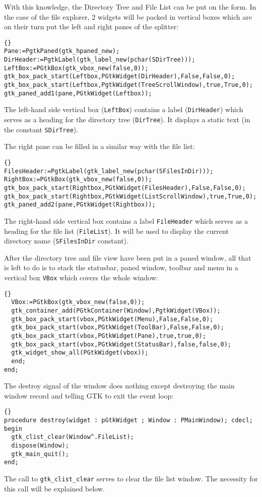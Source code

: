 \documentclass[10pt]{article}
\begin{document}
With this knowledge, the Directory Tree and File List can be put on the
form. In the case of the file explorer, 2 widgets will be packed in vertical
boxes which are on their turn put the left and right panes of the splitter: 
\begin{lstlisting}{}
Pane:=PgtkPaned(gtk_hpaned_new);
DirHeader:=PgtkLabel(gtk_label_new(pchar(SDirTree)));
LeftBox:=PGtkBox(gtk_vbox_new(false,0));
gtk_box_pack_start(Leftbox,PGtkWidget(DirHeader),False,False,0);
gtk_box_pack_start(Leftbox,PgtkWidget(TreeScrollWindow),true,True,0);
gtk_paned_add1(pane,PGtkWidget(Leftbox));
\end{lstlisting}
The left-hand side vertical box (\lstinline|LeftBox|) contains a label 
(\lstinline|DirHeader|) which serves as a  heading for the directory tree (\lstinline|DirTree|). 
It displays a static text (in the constant \lstinline|SDirTree|).

The right pane can be filled in a similar way with the file list:
\begin{lstlisting}{}
FilesHeader:=PgtkLabel(gtk_label_new(pchar(SFilesInDir)));
RightBox:=PGtkBox(gtk_vbox_new(false,0));
gtk_box_pack_start(Rightbox,PGtkWidget(FilesHeader),False,False,0);
gtk_box_pack_start(Rightbox,PGtkWidget(ListScrollWindow),true,True,0);
gtk_paned_add2(pane,PGtkWidget(Rightbox));
\end{lstlisting}
The right-hand side vertical box contains a label \lstinline|FileHeader| 
which serves as a heading for the file list (\lstinline|FileList|). 
It will be used to display the current directory name 
(\lstinline|SFilesInDir| constant).

After the directory tree and file view have been put in a paned window,
all that is left to do is to stack the statusbar, paned window, toolbar 
and menu in a vertical box \lstinline|VBox| which covers the whole window:
\begin{lstlisting}{}
  VBox:=PGtkBox(gtk_vbox_new(false,0));
  gtk_container_add(PGtkContainer(Window),PgtkWidget(VBox));
  gtk_box_pack_start(vbox,PGtkWidget(Menu),False,False,0);
  gtk_box_pack_start(vbox,PGtkWidget(ToolBar),False,False,0);
  gtk_box_pack_start(vbox,PGtkWidget(Pane),true,true,0);
  gtk_box_pack_start(vbox,PGtkWidget(StatusBar),false,false,0);
  gtk_widget_show_all(PGtkWidget(vbox));
  end;
end;
\end{lstlisting}
The destroy signal of the window does nothing except destroying the
main window record and telling GTK to exit the event loop:
\begin{lstlisting}{}
procedure destroy(widget : pGtkWidget ; Window : PMainWindow); cdecl;
begin
  gtk_clist_clear(Window^.FileList);
  dispose(Window);
  gtk_main_quit();
end;
\end{lstlisting}
The call to \lstinline|gtk_clist_clear| serves to clear the file list window.
The necessity for this call will be explained below.
\end{document}
